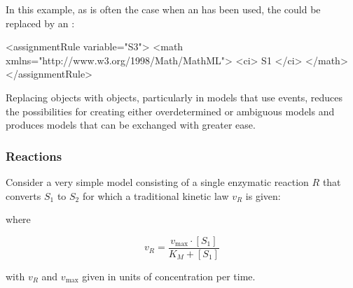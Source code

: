 In this example, as is often the case when an \AlgebraicRule has
been used, the \AlgebraicRule could be replaced by an
\AssignmentRule:

\begin{example}
<assignmentRule variable="S3">
    <math xmlns="http://www.w3.org/1998/Math/MathML">
       <ci> S1 </ci>
    </math>
</assignmentRule>
\end{example}

Replacing \AlgebraicRule objects with \AssignmentRule objects,
particularly in models that use events, reduces the possibilities
for creating either overdetermined or ambiguous models and
produces models that can be exchanged with greater ease.


\subsubsection{Reactions}
\label{sec:bp:reactions}


Consider a very simple model consisting of a single enzymatic reaction
$R$ that converts $S_{1}$ to $S_{2}$ for which a traditional kinetic
law $v_{R}$ is given:
\begin{center}
\end{center}
where
\begin{linenomath}
  \begin{equation*}
    v_{R} = \frac{v_\text{max} \cdot [S_{1}]}{K_{M} + [S_{1}]}
  \end{equation*}
\end{linenomath}

with $v_{R}$ and $v_\text{max}$ given in units of concentration
per time.

